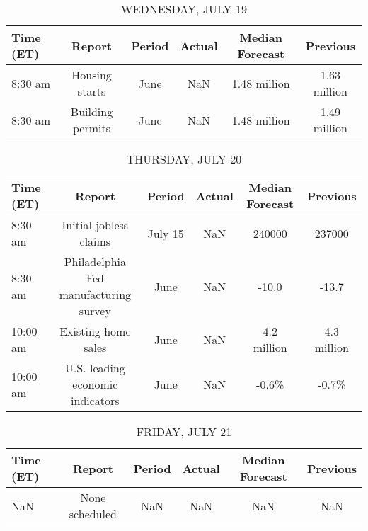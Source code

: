 \documentclass{article}%
\begin{document}
\begin{table}[htbp]%
\caption{WEDNESDAY, JULY 19}%
\centering%
\begin{adjustbox}{width=1\textwidth}%
\begin{tabular}{lccccc}
\toprule
Time (ET) &           Report & Period & Actual & Median Forecast &     Previous \\
\midrule
  8:30 am &   Housing starts &   June &    NaN &    1.48 million & 1.63 million \\
  8:30 am & Building permits &   June &    NaN &    1.48 million & 1.49 million \\
\bottomrule
\end{tabular}
%
\end{adjustbox}%
\end{table}

%


\begin{table}[htbp]%
\caption{THURSDAY, JULY 20}%
\centering%
\begin{adjustbox}{width=1\textwidth}%
\begin{tabular}{lccccc}
\toprule
Time (ET) &                                Report &  Period & Actual & Median Forecast &    Previous \\
\midrule
  8:30 am &                Initial jobless claims & July 15 &    NaN &          240000 &      237000 \\
  8:30 am & Philadelphia Fed manufacturing survey &    June &    NaN &           -10.0 &       -13.7 \\
 10:00 am &                   Existing home sales &    June &    NaN &     4.2 million & 4.3 million \\
 10:00 am &      U.S. leading economic indicators &    June &    NaN &           -0.6\% &       -0.7\% \\
\bottomrule
\end{tabular}
%
\end{adjustbox}%
\end{table}

%


\begin{table}[htbp]%
\caption{FRIDAY, JULY 21}%
\centering%
\begin{adjustbox}{width=1\textwidth}%
\begin{tabular}{lccccc}
\toprule
Time (ET) &         Report & Period & Actual & Median Forecast & Previous \\
\midrule
      NaN & None scheduled &    NaN &    NaN &             NaN &      NaN \\
\bottomrule
\end{tabular}
%
\end{adjustbox}%
\end{table}
\end{document}

